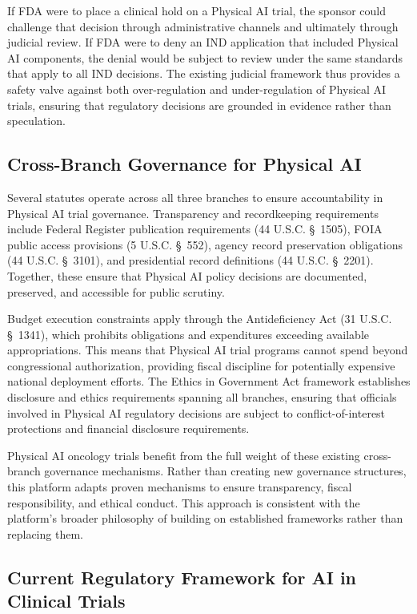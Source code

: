 If FDA were to place a clinical hold on a Physical AI trial, the sponsor could
challenge that decision through administrative channels and ultimately through
judicial review. If FDA were to deny an IND application that included Physical
AI components, the denial would be subject to review under the same standards
that apply to all IND decisions. The existing judicial framework thus provides
a safety valve against both over-regulation and under-regulation of Physical AI
trials, ensuring that regulatory decisions are grounded in evidence rather than
speculation.

\subsection{Cross-Branch Governance for Physical AI}
\label{subsec:cross-branch}

Several statutes operate across all three branches to ensure accountability in
Physical AI trial governance. Transparency and recordkeeping requirements
include Federal Register publication requirements (44 U.S.C. \S~1505), FOIA
public access provisions (5 U.S.C. \S~552), agency record preservation
obligations (44 U.S.C. \S~3101), and presidential record definitions
(44 U.S.C. \S~2201). Together, these ensure that Physical AI policy decisions
are documented, preserved, and accessible for public scrutiny.

Budget execution constraints apply through the Antideficiency Act (31 U.S.C.
\S~1341), which prohibits obligations and expenditures exceeding available
appropriations. This means that Physical AI trial programs cannot spend beyond
congressional authorization, providing fiscal discipline for potentially
expensive national deployment efforts. The Ethics in Government Act framework
establishes disclosure and ethics requirements spanning all branches, ensuring
that officials involved in Physical AI regulatory decisions are subject to
conflict-of-interest protections and financial disclosure requirements.

Physical AI oncology trials benefit from the full weight of these existing
cross-branch governance mechanisms. Rather than creating new governance
structures, this platform adapts proven mechanisms to ensure transparency,
fiscal responsibility, and ethical conduct. This approach is consistent with the
platform's broader philosophy of building on established frameworks rather than
replacing them.

\subsection{Current Regulatory Framework for AI in Clinical Trials}
\label{subsec:current-ai-framework}

